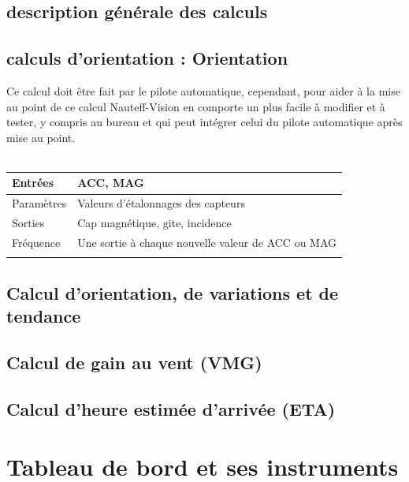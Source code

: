 \documentclass[a4paper,11pt]{report}
\begin{document}
\subsection{description générale des calculs}
\subsection{calculs d'orientation : Orientation}
Ce calcul doit être fait par le pilote automatique, cependant, pour aider
à la mise au point de ce calcul Nauteff-Vision en comporte un plus facile
à modifier et à tester, y compris au bureau et qui peut intégrer celui 
du pilote automatique après mise au point.
\\
\\
\begin{tabular}{|l|p{6cm}|}
	\hline 
	Entrées & ACC, MAG \\ 
	\hline 
    Paramètres & Valeurs d'étalonnages des capteurs  \\ 
	\hline 
	Sorties &  Cap magnétique, \gls{gite}, incidence\\ 
	\hline 
	Fréquence & Une sortie à chaque nouvelle valeur de ACC ou MAG \\
	\hline 
	&  \\ 
	\hline
	
\end{tabular} 
\subsection{Calcul d'orientation, de variations et de tendance}
\subsection{Calcul de gain au vent (VMG)}
\subsection{Calcul d'heure estimée d'arrivée (ETA)}

\section{Tableau de bord et ses instruments}
\end{document}
